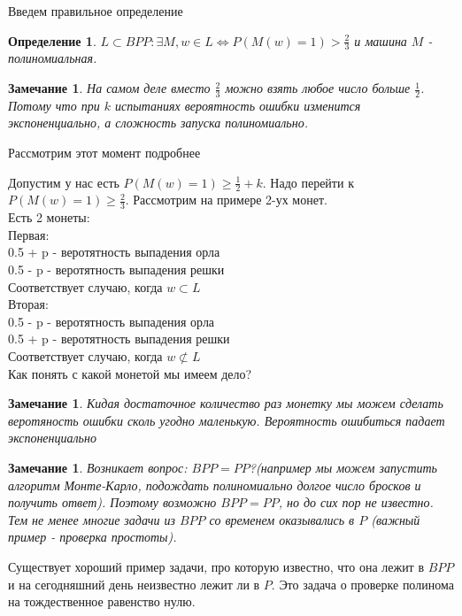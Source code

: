 \documentclass{beamer}
\theoremstyle{plain}
\newtheorem{rmk}[thm]{Замечание}
\newtheorem{dfn}[thm]{Определение}
\theoremstyle{definition}
\begin{document}
\begin{frame}
    Введем правильное определение
    \begin{dfn}
        $ L \subset BPP : \exists M, w \in L \Leftrightarrow P(M(w)=1)>\frac{2}{3}$ и машина $M$ - полиномиальная.
    \end{dfn}
    \begin{rmk}
        На самом деле вместо $\frac{2}{3}$ можно взять любое число больше $\frac{1}{2}$. Потому что при $k$ испытаниях вероятность ошибки изменится экспоненциально, а сложность запуска полиномиально.
    \end{rmk}
    Рассмотрим этот момент подробнее
\end{frame}

\begin{frame}
    Допустим у нас есть $P(M(w)=1) \geq  \frac{1}{2} + k$. Надо перейти к $P(M(w)=1) \geq \frac{2}{3}$. Рассмотрим на примере 2-ух монет. \\
    Есть 2 монеты: \\
    Первая: \\
        0.5 + p - веротятность выпадения орла \\
        0.5 - p - веротятность выпадения решки \\
    Соответствует случаю, когда $ w \subset L$ \\
    Вторая: \\
        0.5 - p - веротятность выпадения орла \\
        0.5 + p - веротятность выпадения решки \\
    Соответствует случаю, когда $ w \not\subset L$ \\
    Как понять с какой монетой мы имеем дело?
    \begin{rmk}
        Кидая достаточное количество раз монетку мы можем сделать веротяность ошибки сколь угодно маленькую. Вероятность ошибиться падает экспоненциально
    \end{rmk}
        
\end{frame}

\begin{frame}
    \begin{rmk}
        Возникает вопрос: $BPP = PP$?(например мы можем запустить алгоритм Монте-Карло, подождать полиномиально долгое число бросков и получить ответ). Поэтому возможно $BPP = PP$, но до сих пор не известно. Тем не менее многие задачи из $BPP$ со временем оказывались в $P$ (важный пример - проверка простоты).
    \end{rmk}
    Существует хороший пример задачи, про которую известно, что она лежит в $BPP$ и на сегодняшний день неизвестно лежит ли в $P$. Это задача о проверке полинома на тождественное равенство нулю.
\end{frame}
\end{document}
